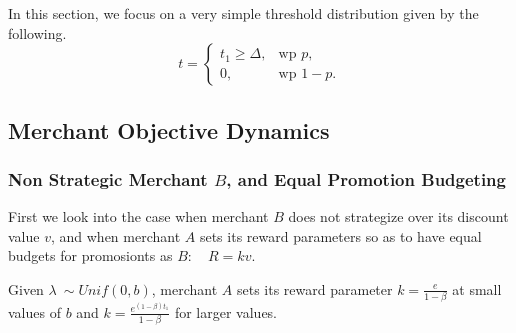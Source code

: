 In this section, we focus on a very simple threshold distribution given by the following.
\begin{equation*}
  t=\begin{cases}
    t_1\geq \Delta, & \text{wp } p,\\
    0, & \text{wp } 1-p.
  \end{cases}
\end{equation*}

\subsection{Merchant Objective Dynamics}
\subsubsection{Non Strategic Merchant $B$, and Equal Promotion Budgeting}
First we look into the case when merchant $B$ does not strategize over its discount value $v$, and when merchant $A$ sets its reward parameters so as to have equal budgets for promosionts as $B$: \ie~ $R = k v$.
\begin{theorem}
Given $\lambda~\sim Unif(0,b)$, merchant $A$ sets its reward parameter $k = \frac{e}{1-\beta}$ at small values of $b$ and $k = \frac{e^{(1-\beta)t_1}}{1-\beta}$ for larger values.
\end{theorem}
